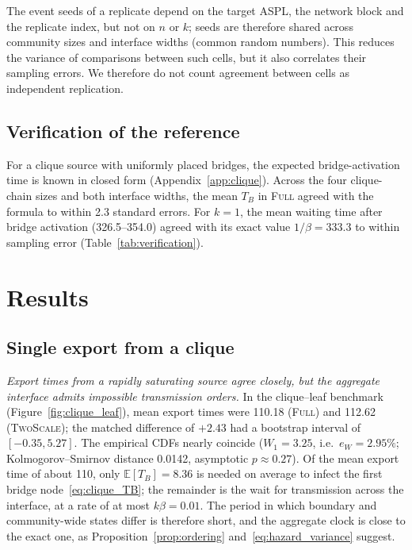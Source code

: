 \documentclass[a4paper,fleqn]{cas-sc}
\newcommand{\Full}{\textup{\textsc{Full}}}
\newcommand{\TS}{\textup{\textsc{TwoScale}}}
\newcommand{\eW}{e_{W}}
\begin{document}
The event seeds of a replicate depend on the target ASPL, the network block and the replicate index, but not on $n$ or $k$; seeds are therefore shared across community sizes and interface widths (common random numbers). This reduces the variance of comparisons between such cells, but it also correlates their sampling errors. We therefore do not count agreement between cells as independent replication.

\subsection{Verification of the reference}

For a clique source with uniformly placed bridges, the expected bridge-activation time is known in closed form (Appendix~\ref{app:clique}). Across the four clique-chain sizes and both interface widths, the mean $T_B$ in \Full{} agreed with the formula to within 2.3 standard errors. For $k=1$, the mean waiting time after bridge activation (326.5--354.0) agreed with its exact value $1/\beta=333.3$ to within sampling error (Table~\ref{tab:verification}).

\section{Results}
\label{sec:results}

\subsection{Single export from a clique}
\label{sec:res_clique}

\emph{Export times from a rapidly saturating source agree closely, but the aggregate interface admits impossible transmission orders.} In the clique--leaf benchmark (Figure~\ref{fig:clique_leaf}), mean export times were 110.18 (\Full{}) and 112.62 (\TS{}); the matched difference of $+2.43$ had a bootstrap interval of $[-0.35,5.27]$. The empirical CDFs nearly coincide ($W_1=3.25$, i.e.\ $\eW=2.95\%$; Kolmogorov--Smirnov distance 0.0142, asymptotic $p\approx0.27$). Of the mean export time of about 110, only $\mathbb{E}[T_B]=8.36$ is needed on average to infect the first bridge node~\eqref{eq:clique_TB}; the remainder is the wait for transmission across the interface, at a rate of at most $k\beta=0.01$. The period in which boundary and community-wide states differ is therefore short, and the aggregate clock is close to the exact one, as Proposition~\ref{prop:ordering} and~\eqref{eq:hazard_variance} suggest.
\end{document}
